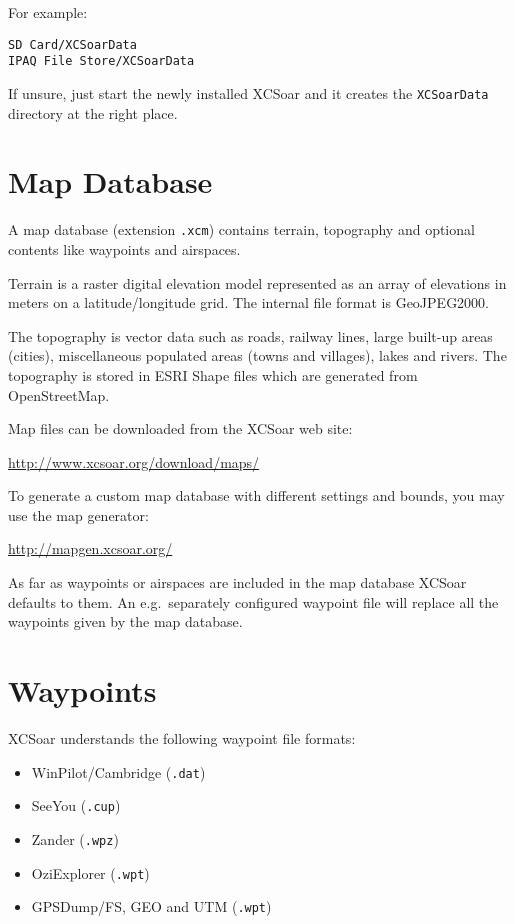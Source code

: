 For example:
\begin{verbatim}
SD Card/XCSoarData
IPAQ File Store/XCSoarData
\end{verbatim}

If unsure, just start the newly installed XCSoar and it creates the \verb|XCSoarData|
directory at the right place.

\section{Map Database}\label{sec:map}

A map database (extension \verb|.xcm|) contains terrain,
topography and optional contents like waypoints and airspaces.

Terrain is a raster digital elevation model represented as an array of
elevations in meters on a latitude/longitude grid.  The internal file
format is GeoJPEG2000.

The topography is vector data such as roads, railway lines, large
built-up areas (cities), miscellaneous populated areas (towns and
villages), lakes and rivers.  The topography is stored in ESRI Shape
files which are generated from OpenStreetMap.

Map files can be downloaded from the XCSoar web site:

\url{http://www.xcsoar.org/download/maps/}

To generate a custom map database with different settings and bounds, you
may use the map generator:

\url{http://mapgen.xcsoar.org/}

As far as waypoints or airspaces are included in the map database XCSoar
defaults to them. An e.g.\ separately configured waypoint file will replace all the
waypoints given by the map database.

\section{Waypoints}

XCSoar understands the following waypoint file formats:

\begin{itemize}
\item WinPilot/Cambridge (\verb|.dat|)
\item SeeYou (\verb|.cup|)
\item Zander (\verb|.wpz|)
\item OziExplorer (\verb|.wpt|)
\item GPSDump/FS, GEO and UTM (\verb|.wpt|)
\end{itemize}

